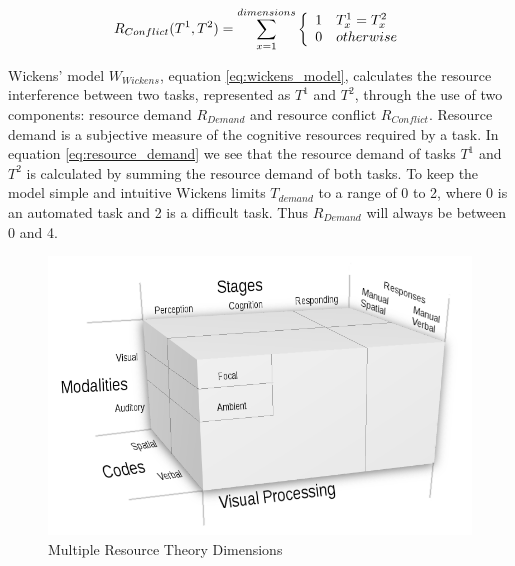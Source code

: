 \begin{equation}
  R_{Conflict}(T^{1}, T^{2}) = \sum_{x=1}^{dimensions} \left\{
    \begin{array}{l l}
      1 & T_{x}^{1} = T_{x}^{2} \\
      0 & otherwise \\
    \end{array}
    \right.
  \label{eq:resource_conflict}
\end{equation}

Wickens' model $W_{Wickens}$, equation \ref{eq:wickens_model}, calculates the resource interference between two tasks, represented as $T^{1}$ and $T^{2}$, through the use of two components: resource demand $R_{Demand}$ and resource conflict $R_{Conflict}$.  Resource demand is a subjective measure of the cognitive resources required by a task.  In equation \ref{eq:resource_demand} we see that the resource demand of tasks $T^{1}$ and $T^{2}$ is calculated by summing the resource demand of both tasks.  To keep the model simple and intuitive Wickens limits $T_{demand}$ to a range of 0 to 2, where 0 is an automated task and 2 is a difficult task.  Thus $R_{Demand}$ will always be between 0 and 4.


\begin{figure}[h]
\begin{center}
\includegraphics[width=6in]{multipleresourcetheory.png}
\caption{Multiple Resource Theory Dimensions~\cite{wickens2002multiple}}
\label{fig:multipleresourcetheory}
\end{center}
\end{figure}

